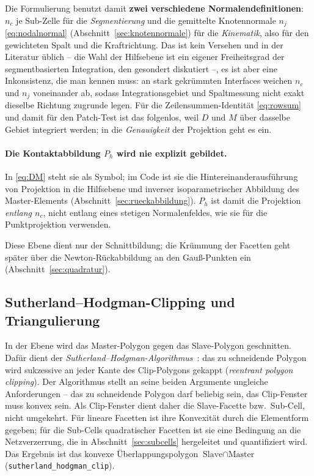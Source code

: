 \documentclass[a4paper,11pt]{article}
\def\bm#1{#1}%
\newcommand{\code}[1]{\texttt{\small #1}}
\begin{document}
Die Formulierung benutzt damit \textbf{zwei verschiedene Normalendefinitionen}: $\bm n_c$ je
Sub-Zelle für die \emph{Segmentierung} und die gemittelte Knotennormale $\bm n_j$
\eqref{eq:nodalnormal} (Abschnitt~\ref{sec:knotennormale}) für die \emph{Kinematik}, also für den
gewichteten Spalt und die Kraftrichtung. Das ist kein Versehen und in der Literatur üblich -- die Wahl der Hilfsebene ist
ein eigener Freiheitsgrad der segmentbasierten Integration, den \citet[Anh.~A.1.2--A.1.3]{farah}
gesondert diskutiert --, es ist aber eine Inkonsistenz, die man kennen muss: an stark gekrümmten
Interfaces weichen $\bm n_c$ und $\bm n_j$ voneinander ab, sodass Integrationsgebiet und
Spaltmessung nicht exakt dieselbe Richtung zugrunde legen. Für die Zeilensummen-Identität
\eqref{eq:rowsum} und damit für den Patch-Test ist das folgenlos, weil $\bm D$ und $\bm M$ über
dasselbe Gebiet integriert werden; in die \emph{Genauigkeit} der Projektion geht es ein.

\paragraph{Die Kontaktabbildung $P_h$ wird nie explizit gebildet.} In \eqref{eq:DM} steht sie als
Symbol; im Code ist sie die Hintereinanderausführung von Projektion in die Hilfsebene und inverser
isoparametrischer Abbildung des Master-Elements (Abschnitt~\ref{sec:rueckabbildung}). $P_h$ ist
damit die Projektion \emph{entlang $\bm n_c$}, nicht entlang eines stetigen Normalenfeldes, wie sie
\citet{poppgeewall2009} für die Punktprojektion verwenden.

\medskip
\noindent Diese Ebene dient nur der Schnittbildung; die Krümmung der Facetten geht später über die
Newton-Rückabbildung an den Gauß-Punkten ein (Abschnitt~\ref{sec:quadratur}).

\subsection{Sutherland--Hodgman-Clipping und Triangulierung}
In der Ebene wird das Master-Polygon gegen das Slave-Polygon geschnitten. Dafür dient der
\emph{Sutherland--Hodgman-Algorithmus}~\citep{sutherland1974}: das zu schneidende Polygon wird
sukzessive an jeder Kante des Clip-Polygons gekappt (\emph{reentrant polygon clipping}). Der
Algorithmus stellt an seine beiden Argumente ungleiche Anforderungen -- das zu schneidende Polygon
darf beliebig sein, das Clip-Fenster muss konvex sein. Als Clip-Fenster dient daher die
Slave-Facette bzw.\ Sub-Cell, nicht umgekehrt. Für lineare Facetten ist ihre Konvexität durch die
Elementform gegeben; für die Sub-Cells quadratischer Facetten ist sie eine Bedingung an die
Netzverzerrung, die in Abschnitt~\ref{sec:subcells} hergeleitet und quantifiziert wird. Das
Ergebnis ist das konvexe Überlappungspolygon $\text{Slave}\cap\text{Master}$
(\code{sutherland\_hodgman\_clip}).
\end{document}
